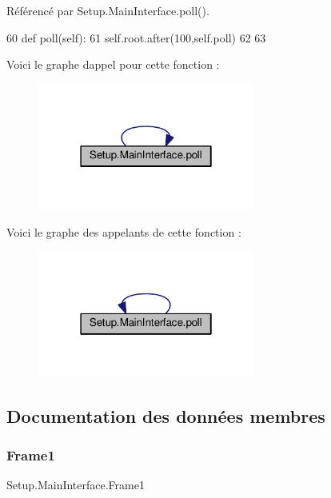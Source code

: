 Référencé par Setup.\+Main\+Interface.\+poll().


\begin{DoxyCode}
60     \textcolor{keyword}{def }poll(self):
61         self.root.after(100,self.poll)
62 
63 
\end{DoxyCode}
Voici le graphe d\textquotesingle{}appel pour cette fonction \+:
\nopagebreak
\begin{figure}[H]
\begin{center}
\leavevmode
\includegraphics[width=202pt]{classSetup_1_1MainInterface_aeed36bab3e2220dbe30b6f008f94a9b3_cgraph}
\end{center}
\end{figure}
Voici le graphe des appelants de cette fonction \+:
\nopagebreak
\begin{figure}[H]
\begin{center}
\leavevmode
\includegraphics[width=202pt]{classSetup_1_1MainInterface_aeed36bab3e2220dbe30b6f008f94a9b3_icgraph}
\end{center}
\end{figure}


\subsection{Documentation des données membres}
\mbox{\label{classSetup_1_1MainInterface_a4e3c881d6cc46af91313eb44b56e726c}} 
\subsubsection{\texorpdfstring{Frame1}{Frame1}}
{\footnotesize\ttfamily Setup.\+Main\+Interface.\+Frame1}



